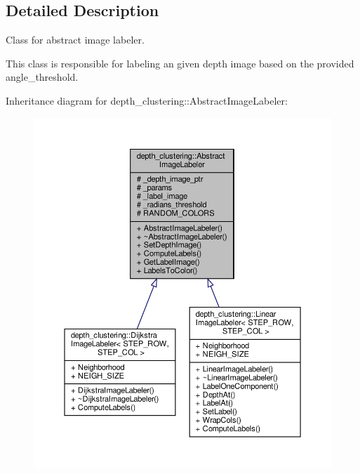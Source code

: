 \subsection{Detailed Description}
Class for abstract image labeler. 

This class is responsible for labeling an given depth image based on the provided angle\+\_\+threshold. 

Inheritance diagram for depth\+\_\+clustering\+:\+:Abstract\+Image\+Labeler\+:\nopagebreak
\begin{figure}[H]
\begin{center}
\leavevmode
\includegraphics[width=350pt]{classdepth__clustering_1_1AbstractImageLabeler__inherit__graph}
\end{center}
\end{figure}


